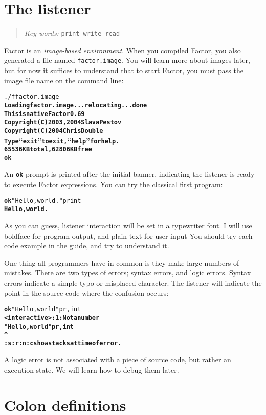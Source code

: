 \documentclass[english]{book}
\newcommand{\chapkeywords}[1]{{\parbox{10cm}{\begin{minipage}[b]{10cm}
\begin{quote}
\emph{Key words:} \texttt{#1}
\end{quote}
\end{minipage}}}}
\begin{document}
\section{The listener}

\chapkeywords{print write read}

Factor is an \emph{image-based environment}. When you compiled Factor, you also generated a file named \texttt{factor.image}. You will learn more about images later, but for now it suffices to understand that to start Factor, you must pass the image file name on the command line:

\begin{alltt}
./f factor.image
\textbf{Loading factor.image... relocating... done
This is native Factor 0.69
Copyright (C) 2003, 2004 Slava Pestov
Copyright (C) 2004 Chris Double
Type ``exit'' to exit, ``help'' for help.
65536 KB total, 62806 KB free
ok}
\end{alltt}

An \texttt{\textbf{ok}} prompt is printed after the initial banner, indicating the listener is ready to execute Factor expressions. You can try the classical first program:

\begin{alltt}
\textbf{ok} "Hello, world." print
\textbf{Hello, world.}
\end{alltt}

As you can guess, listener interaction will be set in a typewriter font. I will use boldface for program output, and plain text for user input  You should try each code example in the guide, and try to understand it.

One thing all programmers have in common is they make large numbers of mistakes. There are two types of errors; syntax errors, and logic errors. Syntax errors indicate a simple typo or misplaced character. The listener will indicate the point in the source code where the confusion occurs:

\begin{alltt}
\textbf{ok} "Hello, world" pr,int
\textbf{<interactive>:1: Not a number
"Hello, world" pr,int
                     ^
:s :r :n :c show stacks at time of error.}
\end{alltt}

A logic error is not associated with a piece of source code, but rather an execution state. We will learn how to debug them later.

\section{Colon definitions}
\end{document}
